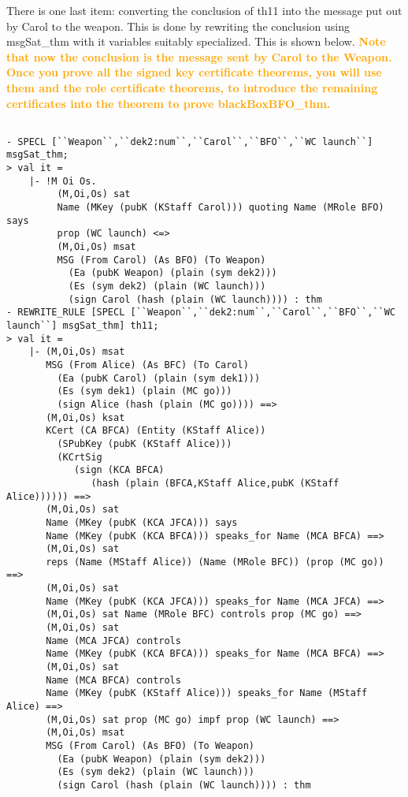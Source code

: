 \documentclass[10pt,twoside]{article}
\newcommand{\standout}[1]{\textcolor{orange}{#1}}
\begin{document}
There is one last item: converting the conclusion of th11 into the
message put out by Carol to the weapon. This is done by rewriting the
conclusion using msgSat\_thm with it variables suitably specialized.
This is shown below. \textbf{\standout{Note that now the conclusion is
    the message sent by Carol to the Weapon. Once you prove all the
    signed key certificate theorems, you will use them and the role
    certificate theorems, to introduce the remaining certificates into
    the theorem to prove blackBoxBFO\_thm.}}
\begin{session}
  \begin{scriptsize}
\begin{verbatim}

- SPECL [``Weapon``,``dek2:num``,``Carol``,``BFO``,``WC launch``] msgSat_thm;
> val it =
    |- !M Oi Os.
         (M,Oi,Os) sat
         Name (MKey (pubK (KStaff Carol))) quoting Name (MRole BFO) says
         prop (WC launch) <=>
         (M,Oi,Os) msat
         MSG (From Carol) (As BFO) (To Weapon)
           (Ea (pubK Weapon) (plain (sym dek2)))
           (Es (sym dek2) (plain (WC launch)))
           (sign Carol (hash (plain (WC launch)))) : thm
- REWRITE_RULE [SPECL [``Weapon``,``dek2:num``,``Carol``,``BFO``,``WC launch``] msgSat_thm] th11;
> val it =
    |- (M,Oi,Os) msat
       MSG (From Alice) (As BFC) (To Carol)
         (Ea (pubK Carol) (plain (sym dek1)))
         (Es (sym dek1) (plain (MC go)))
         (sign Alice (hash (plain (MC go)))) ==>
       (M,Oi,Os) ksat
       KCert (CA BFCA) (Entity (KStaff Alice))
         (SPubKey (pubK (KStaff Alice)))
         (KCrtSig
            (sign (KCA BFCA)
               (hash (plain (BFCA,KStaff Alice,pubK (KStaff Alice)))))) ==>
       (M,Oi,Os) sat
       Name (MKey (pubK (KCA JFCA))) says
       Name (MKey (pubK (KCA BFCA))) speaks_for Name (MCA BFCA) ==>
       (M,Oi,Os) sat
       reps (Name (MStaff Alice)) (Name (MRole BFC)) (prop (MC go)) ==>
       (M,Oi,Os) sat
       Name (MKey (pubK (KCA JFCA))) speaks_for Name (MCA JFCA) ==>
       (M,Oi,Os) sat Name (MRole BFC) controls prop (MC go) ==>
       (M,Oi,Os) sat
       Name (MCA JFCA) controls
       Name (MKey (pubK (KCA BFCA))) speaks_for Name (MCA BFCA) ==>
       (M,Oi,Os) sat
       Name (MCA BFCA) controls
       Name (MKey (pubK (KStaff Alice))) speaks_for Name (MStaff Alice) ==>
       (M,Oi,Os) sat prop (MC go) impf prop (WC launch) ==>
       (M,Oi,Os) msat
       MSG (From Carol) (As BFO) (To Weapon)
         (Ea (pubK Weapon) (plain (sym dek2)))
         (Es (sym dek2) (plain (WC launch)))
         (sign Carol (hash (plain (WC launch)))) : thm
\end{verbatim}
  \end{scriptsize}
\end{session}
\end{document}
